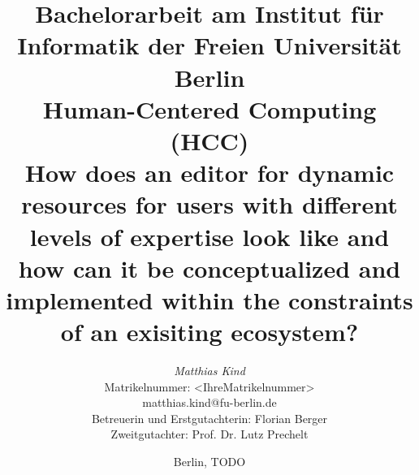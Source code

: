 %
\begin{titlepage}

\title{
{\small Bachelorarbeit am Institut für Informatik der Freien Universität Berlin}\\
{\small Human-Centered Computing (HCC)}\\
[6ex]
{\LARGE How does an editor for dynamic resources for users with different levels of expertise look like and how can it be conceptualized and implemented within the constraints of an exisiting ecosystem?}}

\author{
{\emph{\normalsize{Matthias Kind}}}\\
{\normalsize Matrikelnummer: <IhreMatrikelnummer>}\\
{\normalsize matthias.kind@fu-berlin.de}\\ 
[18ex]   
{\normalsize Betreuerin und Erstgutachterin: Florian Berger} \\
{\normalsize Zweitgutachter: Prof. Dr. Lutz Prechelt}}
\vspace{6ex}
\date{\normalsize Berlin, TODO}
\maketitle
\end{titlepage}
